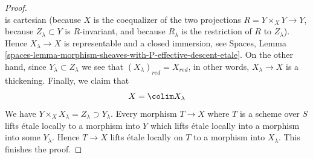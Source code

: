 \begin{proof}
$$$$
is cartesian (because $X$ is the coequalizer of the two projections
$R = Y \times_X Y \to Y$, because $Z_\lambda \subset Y$ is $R$-invariant,
and because $R_\lambda$ is the restriction of $R$ to $Z_\lambda$).
Hence $X_\lambda \to X$ is representable and a closed immersion, see
Spaces, Lemma
\ref{spaces-lemma-morphism-sheaves-with-P-effective-descent-etale}.
On the other hand, since $Y_\lambda \subset Z_\lambda$ we see that
$(X_\lambda)_{red} = X_{red}$, in other words, $X_\lambda \to X$
is a thickening. Finally, we claim that
$$
X = \colim X_\lambda
$$
We have $Y \times_X X_\lambda = Z_\lambda \supset Y_\lambda$. Every
morphism $T \to X$ where $T$ is a scheme over $S$ lifts \'etale locally
to a morphism into $Y$ which lifts \'etale locally into a morphism
into some $Y_\lambda$. Hence $T \to X$ lifts \'etale locally on
$T$ to a morphism into $X_\lambda$. This finishes the proof.
\end{proof}

